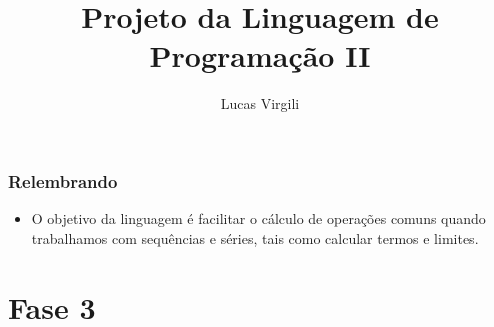 \documentclass{beamer}
\title{Projeto da Linguagem de Programa\c c\~ao II}
\author{Lucas Virgili}
\date{}
\begin{document}
\begin{frame}[fragile]
  \titlepage
\end{frame}

\begin{frame}[fragile]
  \frametitle{Relembrando}
  \begin{itemize}
  \item O objetivo da linguagem \'e facilitar o c\'alculo de opera\c
    c\~oes comuns quando trabalhamos com sequ\^encias e s\'eries, tais
    como calcular termos e limites.
  \end{itemize}
\end{frame}

\section{Fase 3}
\end{document}

